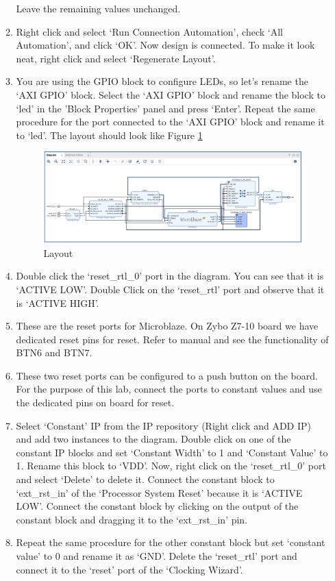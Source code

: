 \documentclass[11pt,twoside,titlepage]{article}
\begin{document}
\begin{enumerate}
\begin{enumerate}
			Leave the remaining values unchanged.
			\item Right click and select `Run Connection Automation', check `All Automation', and click `OK'. Now  design is connected. To make it look neat, right click and select `Regenerate Layout'. 
			\item You are using the GPIO block to configure LEDs, so let's rename the `AXI GPIO' block. Select the `AXI GPIO' block and rename the block to `led' in the 'Block Properties' panel and press `Enter'. Repeat the same procedure for the port connected to the `AXI GPIO' block and rename it to `led'. The layout should look like Figure \ref{lay}   
			\begin{figure}[h]
				\begin{center}
					\includegraphics[width=1.0\textwidth]{diagram}
					\caption{Layout}
					\label{lay}
				\end{center}
			\end{figure} 
			\item  Double click the `reset\_rtl\_0' port in the diagram. You can see that it is `ACTIVE LOW'. Double Click on the `reset\_rtl' port and observe that it is `ACTIVE HIGH'.
			\item These are the reset ports for Microblaze. On Zybo Z7-10 board we have dedicated reset pins for reset. Refer to manual and see the functionality of  BTN6 and BTN7.
			\item These two reset ports can be configured to a push button on the board. For the purpose of this lab,  connect the ports to constant values and use the dedicated pins on board for reset.
			\item Select `Constant' IP from the IP repository (Right click and ADD IP) and add two instances to the diagram. Double click on one of the constant IP blocks and set `Constant Width' to 1 and `Constant Value' to 1. Rename this block to `VDD'. Now, right click on the `reset\_rtl\_0'  port and  select `Delete' to delete it. Connect the constant block to `ext\_rst\_in' of the `Processor System Reset' because it is  `ACTIVE LOW'. Connect the constant block by clicking on the output of the constant block and dragging it to the `ext\_rst\_in' pin. 
			\item Repeat the same procedure for the other constant block but set `constant value' to 0 and rename it as `GND'. Delete the  `reset\_rtl' port and connect it to the `reset' port of the `Clocking Wizard'.
			

\end{enumerate}
\end{enumerate}
\end{document}
